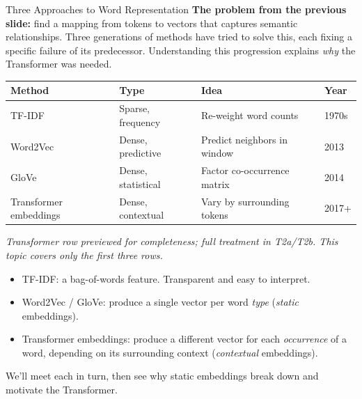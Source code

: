 \begin{frame}{Three Approaches to Word Representation}
\textbf{The problem from the previous slide:} find a mapping from tokens to vectors that captures semantic relationships. Three generations of methods have tried to solve this, each fixing a specific failure of its predecessor. Understanding this progression explains \emph{why} the Transformer was needed.
\medskip
\begin{center}
\renewcommand{\arraystretch}{1.3}
\begin{tabular}{l l l l}
\toprule
\textbf{Method} & \textbf{Type} & \textbf{Idea} & \textbf{Year} \\
\midrule
TF-IDF & Sparse, frequency & Re-weight word counts & 1970s \\
Word2Vec & Dense, predictive & Predict neighbors in window & 2013 \\
GloVe & Dense, statistical & Factor co-occurrence matrix & 2014 \\
Transformer embeddings & Dense, contextual & Vary by surrounding tokens & 2017+ \\
\bottomrule
\end{tabular}
\end{center}

\smallskip
{\footnotesize\textit{Transformer row previewed for completeness; full treatment in T2a/T2b. This topic covers only the first three rows.}}

\medskip
\begin{itemize}
\item TF-IDF: a bag-of-words feature. Transparent and easy to interpret.
\item Word2Vec / GloVe: produce a single vector per word \emph{type} (\emph{static} embeddings).
\item Transformer embeddings: produce a different vector for each \emph{occurrence} of a word, depending on its surrounding context (\emph{contextual} embeddings).
\end{itemize}

\medskip
We'll meet each in turn, then see why static embeddings break down and motivate the Transformer.
\end{frame}


